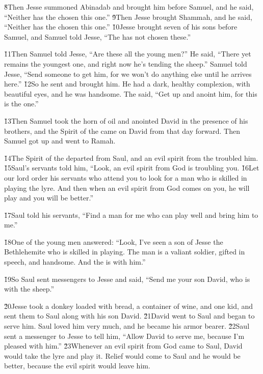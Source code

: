 \v{8}Then Jesse summoned Abinadab and brought him before Samuel, and he said, ``Neither has the  chosen this one.'' \v{9}Then Jesse brought Shammah, and he said, ``Neither has the  chosen this one.'' \v{10}Jesse brought seven of his sons before Samuel, and Samuel told Jesse, ``The  has not chosen these.''

\v{11}Then Samuel told Jesse, ``Are these all the young men?'' He said, ``There yet remains the youngest one, and right now he's tending the sheep.'' Samuel told Jesse, ``Send someone to get him, for we won't do anything else until he arrives here.'' \v{12}So he sent and brought him. He had a dark, healthy complexion, with beautiful eyes, and he was handsome. The  said, ``Get up and anoint him, for this is the one.''

\v{13}Then Samuel took the horn of oil and anointed David in the presence of his brothers, and the Spirit of the  came on David from that day forward. Then Samuel got up and went to Ramah.

\v{14}The Spirit of the  departed from Saul, and an evil spirit from the  troubled him. \v{15}Saul's servants told him, ``Look, an evil spirit from God is troubling you. \v{16}Let our lord order his servants who attend you to look for a man who is skilled in playing the lyre. And then when an evil spirit from God comes on you, he will play and you will be better.''

\v{17}Saul told his servants, ``Find a man for me who can play well and bring him to me.''

\v{18}One of the young men answered: ``Look, I've seen a son of Jesse the Bethlehemite who is skilled in playing. The man is a valiant soldier, gifted in speech, and handsome. And the  is with him.''

\v{19}So Saul sent messengers to Jesse and said, ``Send me your son David, who is with the sheep.''

\v{20}Jesse took a donkey loaded with bread, a container of wine, and one kid, and sent them to Saul along with his son David. \v{21}David went to Saul and began to serve him. Saul loved him very much, and he became his armor bearer. \v{22}Saul sent a messenger to Jesse to tell him, ``Allow David to serve me, because I'm pleased with him.'' \v{23}Whenever an evil spirit from God came to Saul, David would take the lyre and play it. Relief would come to Saul and he would be better, because the evil spirit would leave him.

